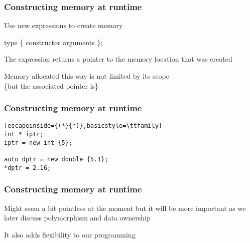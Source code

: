 \documentclass[14pt,a4paper,dvipsnames,usenames]{beamer}
\begin{document}
\begin{frame}[fragile]
  \frametitle{Constructing memory at runtime}

  Use {\color{FeebleWeek}new} expressions to create memory

  \vspace{.5em}

   \hspace{.5em} type \hspace*{.5em} {\ttfamily\{} \:constructor arguments\:
  {\ttfamily\};}

  \vspace{1em}
  The expression returns a pointer to the memory location that was created

  \vspace{1em}
  Memory allocated this way is not limited by its scope\\
  {\footnotesize\{but the associated pointer is\}}


\end{frame}

\begin{frame}[fragile]
  \frametitle{Constructing memory at runtime}

  \begin{lstlisting}[escapeinside={(*}{*)},basicstyle=\ttfamily]
int * iptr;
iptr = new int {5};

auto dptr = new double {5.1};
*dptr = 2.16;
  \end{lstlisting}

\end{frame}

\begin{frame}[fragile]
  \frametitle{Constructing memory at runtime}

  Might seem a bit pointless at the moment but it will be more important as we later discuss polymorphism and data ownership

  \vspace{1em}
  It also adds flexibility to our programming

\end{frame}
\end{document}

